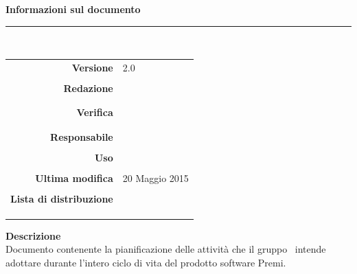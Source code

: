 \begin{titlepage}
\begin{center}
	\vspace{1cm}
	\textbf{Informazioni sul documento}\\
    \rule{10cm}{.4pt} \\
	\begin{table}[h]
	\begin{center}
	\begin{tabular}{r | l}
		\textbf{Versione} & 2.0 \\ \\
		\textbf{Redazione} & \GoIs \\
			& \MaMo \\ \\
		\textbf{Verifica} &\CaMa \\
			& \ReAn \\ \\
		\textbf{Responsabile} & \VeFe \\ \\
		\textbf{Uso} & \uso \\ \\
		\textbf{Ultima modifica} & 20 Maggio 2015 \\ \\
		\textbf{Lista di distribuzione} & \gruppo \\ 
					& \Vardanega \\
					& \Cardin \\
					& \Zucchetti \\
	\end{tabular}
	\end{center}
	\end{table}
			\textbf{Descrizione} \\
Documento contenente la pianificazione delle attività che il gruppo \gruppo\ intende adottare durante l'intero ciclo di vita del prodotto software Premi.
	\end{center}
\end{titlepage}